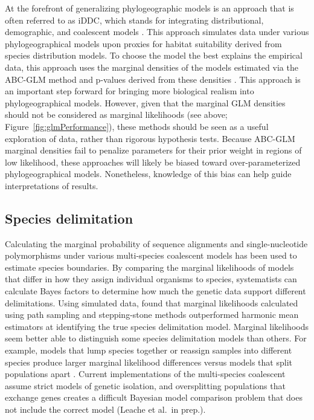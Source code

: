 At the forefront of generalizing phylogeographic models is an approach that is
often referred to as iDDC, which stands for integrating distributional,
demographic, and coalescent models \citep{Papadopoulou2016}.
This approach simulates data under various phylogeographical models upon
proxies for habitat suitability derived from species distribution models.
To choose the model the best explains the empirical data, this approach
uses the marginal densities of the models estimated via the ABC-GLM method
and p-values derived from these densities
\citep{He2013}
\citep{Massatti2016}
\citep{Bemmels2016}
\citep{Knowles2017}
\citep{Papadopoulou2016}.
This approach is an important step forward for bringing more biological realism
into phylogeographical models.
However, given that the marginal GLM densities should not be considered as
marginal likelihoods (see above; Figure~\ref{fig:glmPerformance}), these
methods should be seen as a useful exploration of data, rather than rigorous
hypothesis tests.
Because ABC-GLM marginal densities fail to penalize parameters for their
prior weight in regions of low likelihood, these approaches will likely
be biased toward over-parameterized phylogeographical models.
Nonetheless, knowledge of this bias can help guide interpretations of results.


\subsection{Species delimitation}
Calculating the marginal probability of sequence alignments \citep{Grummer2013}
and single-nucleotide polymorphisms \citep{Leache2014} under various
multi-species coalescent models has been used to estimate species boundaries.
By comparing the marginal likelihoods of models that differ in how they assign
individual organisms to species, systematists can calculate Bayes factors to
determine how much the genetic data support different delimitations.
Using simulated data, \citep{Grummer2013} found that marginal likelihoods
calculated using path sampling and stepping-stone methods outperformed harmonic
mean estimators at identifying the true species delimitation model.
Marginal likelihoods seem better able to distinguish some species delimitation
models than others.
For example, models that lump species together or reassign samples into
different species produce larger marginal likelihood differences versus models
that split populations apart \citep{Grummer2013, Leache2014}.
Current implementations of the multi-species coalescent assume strict models of
genetic isolation, and oversplitting populations that exchange genes creates a
difficult Bayesian model comparison problem that does not include the correct
model (Leache et al.\ in prep.). 


